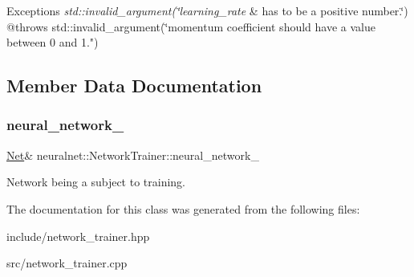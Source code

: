 \begin{DoxyExceptions}{Exceptions}
{\em std\+::invalid\+\_\+argument(\char`\"{}learning\+\_\+rate} & has to be a positive number.\char`\"{})
@throws std\+::invalid\+\_\+argument(\char`\"{}momentum coefficient should have a value between 0 and 1.") \\
\hline
\end{DoxyExceptions}


\subsection{Member Data Documentation}
\mbox{\label{classneuralnet_1_1NetworkTrainer_a779928ec8b2d74240d6b705f46ecf08a}} 
\subsubsection{\texorpdfstring{neural\+\_\+network\+\_\+}{neural\_network\_}}
{\footnotesize\ttfamily \hyperlink{classneuralnet_1_1Net}{Net}\& neuralnet\+::\+Network\+Trainer\+::neural\+\_\+network\+\_\+\hspace{0.3cm}{\ttfamily [protected]}}

Network being a subject to training. 

The documentation for this class was generated from the following files\+:\begin{DoxyCompactItemize}
\item 
include/network\+\_\+trainer.\+hpp\item 
src/network\+\_\+trainer.\+cpp\end{DoxyCompactItemize}
